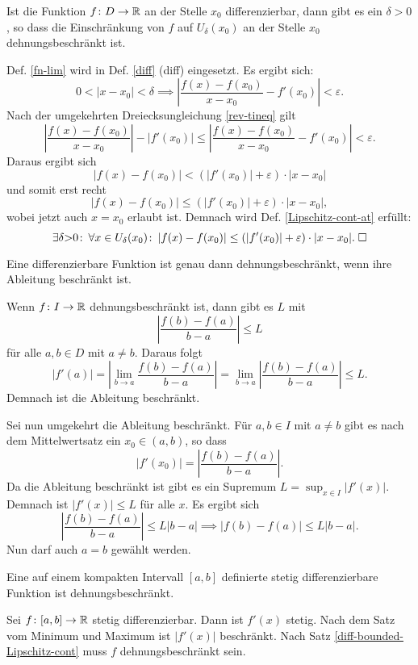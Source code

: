 \begin{Satz}\label{diff-nh-Lipschitz-cont-at}
Ist die Funktion $f\colon D\to\mathbb R$ an der Stelle $x_0$ differenzierbar,
dann gibt es ein $\delta>0$, so dass die Einschränkung von $f$
auf $U_\delta(x_0)$ an der Stelle $x_0$ dehnungsbeschränkt ist.
\end{Satz}

\begin{Beweis}
Def. \ref{fn-lim} wird in Def. \ref{diff} (diff) eingesetzt.
Es ergibt sich:%
\[0<|x-x_0|<\delta\implies
\left|\frac{f(x)-f(x_0)}{x-x_0}-f'(x_0)\right|<\varepsilon.\]
Nach der umgekehrten Dreiecksungleichung \ref{rev-tineq} gilt%
\[\left|\frac{f(x)-f(x_0)}{x-x_0}\right|-|f'(x_0)| \le
\left|\frac{f(x)-f(x_0)}{x-x_0}-f'(x_0)\right|
< \varepsilon.\]
Daraus ergibt sich
\[|f(x)-f(x_0)| < (|f'(x_0)|+\varepsilon)\cdot |x-x_0|\]
und somit erst recht
\[|f(x)-f(x_0)| \le (|f'(x_0)|+\varepsilon)\cdot |x-x_0|,\]
wobei jetzt auch $x=x_0$ erlaubt ist. Demnach wird Def.
\ref{Lipschitz-cont-at} erfüllt:%
\[\exists \delta{>}0\colon\,\forall x\in U_\delta(x_0)\colon\,
|f(x)-f(x_0)| \le (|f'(x_0)|+\varepsilon)\cdot |x-x_0|.\;\square\]
\end{Beweis}

\begin{Satz}\label{diff-bounded-Lipschitz-cont}
Eine differenzierbare Funktion ist genau dann dehnungsbeschränkt,
wenn ihre Ableitung beschränkt ist.
\end{Satz}
\begin{Beweis}
Wenn $f\colon I\to\mathbb R$ dehnungsbeschränkt ist, dann gibt es $L$ mit%
\[\left|\frac{f(b)-f(a)}{b-a}\right|\le L\]
für alle $a,b\in D$ mit $a\ne b$. Daraus folgt%
\[|f'(a)| = \left|\lim_{b\to a} \frac{f(b)-f(a)}{b-a}\right|
= \lim_{b\to a} \left|\frac{f(b)-f(a)}{b-a}\right|
\le L.\]
Demnach ist die Ableitung beschränkt.

Sei nun umgekehrt die Ableitung beschränkt. Für $a,b\in I$ mit $a\ne b$
gibt es nach dem Mittelwertsatz ein $x_0\in(a,b)$, so dass%
\[|f'(x_0)| = \left|\frac{f(b)-f(a)}{b-a}\right|.\]
Da die Ableitung beschränkt ist gibt es ein Supremum
$L = \sup_{x\in I} |f'(x)|$. Demnach ist $|f'(x)|\le L$ für alle $x$.
Es ergibt sich%
\[\left|\frac{f(b)-f(a)}{b-a}\right|\le L|b-a| \implies |f(b)-f(a)|\le L|b-a|.\]
Nun darf auch $a=b$ gewählt werden.\;\qedsymbol
\end{Beweis}

\begin{Satz}\label{diff-compact-Lipschitz-cont}
Eine auf einem kompakten Intervall $[a,b]$ definierte stetig
differenzierbare Funktion ist dehnungsbeschränkt.
\end{Satz}
\begin{Beweis}
Sei $f\colon [a,b]\to\mathbb R$ stetig differenzierbar. Dann ist $f'(x)$ stetig.
Nach dem Satz vom Minimum und Maximum ist $|f'(x)|$ beschränkt. Nach
Satz \ref{diff-bounded-Lipschitz-cont} muss $f$ dehnungsbeschränkt
sein.\;\qedsymbol
\end{Beweis}


